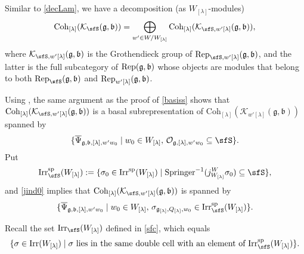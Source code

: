 \documentclass[12pt,a4paper]{amsart}
\def\subset{\subseteq}
\newcommand{\CK}{{\mathcal {K}}}
\newcommand{\CO}{{\mathcal {O}}}
\newcommand{\g}{\mathfrak g}
\renewcommand{\b}{\mathfrak b}
\newcommand{\be}{\begin {equation}}
\newcommand{\ee}{\end {equation}}
\numberwithin{equation}{section}
\theoremstyle{remark}
\def\Irr{\mathrm{Irr}}
\def\Coh{\mathrm{Coh}}
\newcommand{\Lam}{{[\lambda]}}
\begin{document}
Similar to  \eqref{decLam}, we have a decomposition (as $W_\Lam$-modules)
\begin{equation}\label{decLam2}
 \Coh_{\Lam}( \CK_\sfS(\g,\b))=\bigoplus_{w'\in W/W_\Lam}\Coh_{\Lam}(\CK_{ \sfS, w'\Lam}(\g, \b) ),
\end{equation}
where $\CK_{ \sfS, w'\Lam}(\g, \b)$ is the Grothendieck group of $\Rep_{ \sfS, w'\Lam}(\g, \b)$, and the latter is the full subcategory of
$\Rep(\g, \b)$ whose objects are modules that belong to both $\Rep_{ \sfS}(\g, \b)$ and $\Rep_{w'\Lam}(\g, \b)$.


Using , the same argument as  the proof of \eqref{basiss} shows that  $\Coh_{\Lam}(\CK_{ \sfS, w'\Lam}(\g, \b) )$ is a basal subrepresentation of $\Coh_{\Lam}(\CK_{ w'\Lam}(\g, \b) )$ spanned by
\[
 \{ \overline \Psi_{\g,\b, \Lam, w'w_0}\mid w_0\in W_\Lam, \, \CO_{\g, \Lam, w'w_0}\subset \sfS \}.
\]
Put
\[
   \Irr_\sfS^{\mathrm{sp}}(W_\Lam):=\{\sigma_0\in  \Irr^{\mathrm{sp}}(W_\Lam)\mid \mathrm{Springer}^{-1}(j_{W_\Lam}^W \sigma_0)\subset \sfS\},
\]
and \eqref{jind0} implies that $\Coh_{\Lam}(\CK_{ \sfS, w'\Lam}(\g, \b) )$ is  spanned by
\be\label{setbasal}
 \{ \overline \Psi_{\g,\b, \Lam, w'w_0}\mid w_0\in W_\Lam, \,  \sigma_{\g_\Lam, Q_\Lam, w_0}\in   \Irr_\sfS^{\mathrm{sp}}(W_\Lam) \}.
\ee

Recall the set $\Irr_\sfS(W_\Lam)$ defined in \eqref{sfc}, which equals
\[
    \{\sigma \in \Irr(W_\Lam)\mid \textrm{$\sigma$ lies in the same double cell with an element of $ \Irr_\sfS^{\mathrm{sp}}(W_\Lam)$}  \}.
\]
\end{document}
